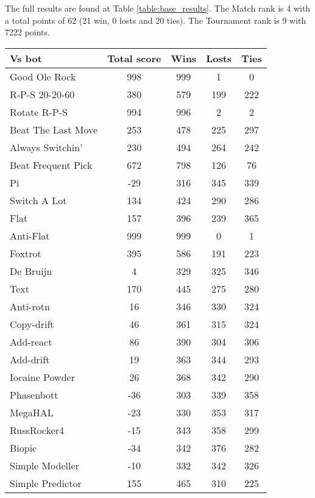 The full results are found at Table \ref{table:base_results}. The Match rank is 4 with a total points of 62 (21 win, 0 losts and 20 ties). The Tournament rank is 9 with 7222 points.

\begin{table*}
    \caption{base results}
    \label{table:base_results}
    \centering
    \begin{tabular}{|l|c|c|c|c|}
        \hline
        \textbf{Vs bot} & \textbf{Total score} & \textbf{Wins} & \textbf{Losts} & \textbf{Ties} \\ \hline
Good Ole Rock & 998 & 999 & 1 & 0 \\ \hline 
R-P-S 20-20-60 & 380 & 579 & 199 & 222 \\ \hline 
Rotate R-P-S & 994 & 996 & 2 & 2 \\ \hline 
Beat The Last Move & 253 & 478 & 225 & 297 \\ \hline 
Always Switchin' & 230 & 494 & 264 & 242 \\ \hline 
Beat Frequent Pick & 672 & 798 & 126 & 76 \\ \hline 
Pi & -29 & 316 & 345 & 339 \\ \hline 
Switch A Lot & 134 & 424 & 290 & 286 \\ \hline 
Flat & 157 & 396 & 239 & 365 \\ \hline 
Anti-Flat & 999 & 999 & 0 & 1 \\ \hline 
Foxtrot & 395 & 586 & 191 & 223 \\ \hline 
De Bruijn & 4 & 329 & 325 & 346 \\ \hline 
Text & 170 & 445 & 275 & 280 \\ \hline 
Anti-rotn & 16 & 346 & 330 & 324 \\ \hline 
Copy-drift & 46 & 361 & 315 & 324 \\ \hline 
Add-react & 86 & 390 & 304 & 306 \\ \hline 
Add-drift & 19 & 363 & 344 & 293 \\ \hline 
Iocaine Powder & 26 & 368 & 342 & 290 \\ \hline 
Phasenbott & -36 & 303 & 339 & 358 \\ \hline 
MegaHAL & -23 & 330 & 353 & 317 \\ \hline 
RussRocker4 & -15 & 343 & 358 & 299 \\ \hline 
Biopic & -34 & 342 & 376 & 282 \\ \hline 
Simple Modeller & -10 & 332 & 342 & 326 \\ \hline 
Simple Predictor & 155 & 465 & 310 & 225 \\ \hline 

\end{tabular}
\end{table*}
